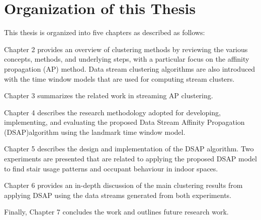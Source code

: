 \section{Organization of this Thesis}
This thesis is organized into five chapters as described as follows:

Chapter 2 provides an overview of clustering methods by reviewing the various concepts, methods, and underlying steps, with a particular focus on the affinity propagation (AP) method.  Data stream clustering algorithms are also introduced with the time window models that are used for computing stream clusters.

Chapter 3 summarizes the related work in streaming AP clustering.

Chapter 4 describes the research methodology adopted for developing, implementing, and evaluating the proposed Data Stream Affinity Propagation (DSAP)algorithm using the landmark time window model. 

Chapter 5 describes the design and implementation of the  DSAP  algorithm. Two experiments are presented that are related to applying the proposed DSAP model to find stair usage patterns and occupant behaviour in indoor spaces.

Chapter 6 provides an in-depth discussion of the main clustering results from applying DSAP using the data streams generated from both experiments. 

Finally, Chapter 7 concludes the work and outlines future research work.
% 







